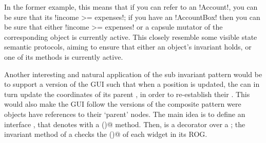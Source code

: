 In the former example, this means that
if you can refer to an \Q!Account!, you can be sure that its \Q!income >= expenses!;
if you have an \Q!AccountBox! then you can be sure that either \Q!income >= expenses! or 
a capsule mutator of the corresponding \Q@Account@ object is currently active.
This closely resemble some visible state semantic protocols, aiming to ensure that  
either an object's invariant holds, or one of its methods is currently active.


Another interesting and natural application of the sub invariant pattern would be to support a version of the GUI such that when a \Q@Widget@s position is updated, the \Q@Widget@ can in turn update the coordinates of its parent \Q@Widget@s, in order to re-establish their \Q@subInvariants@.
This would also make the GUI follow the versions of the composite pattern were objects have references to their `parent' nodes.
The main idea is to define an interface \Q@HasSubInvariant@, that denotes \Q@Widgets@ with a \Q@subInvariant()@ method. Then, \Q@WidgetWithInvariant@ is a decorator over a \Q@Widget@; the invariant method of a \Q@WidgetWithInvariant@ checks the \Q@subInvariant()@ of each widget in its ROG.

